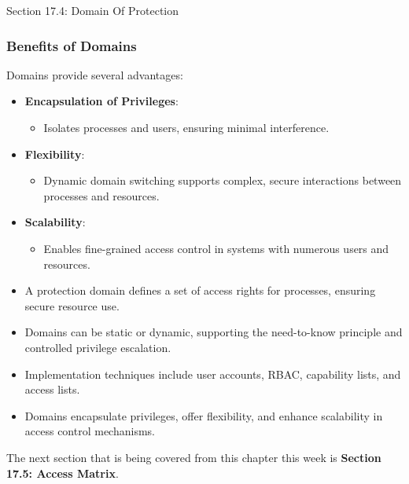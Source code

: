 \begin{notes}{Section 17.4: Domain Of Protection}
    \subsubsection*{Benefits of Domains}
    
    Domains provide several advantages:
    \begin{itemize}
        \item \textbf{Encapsulation of Privileges}:
        \begin{itemize}
            \item Isolates processes and users, ensuring minimal interference.
        \end{itemize}
        \item \textbf{Flexibility}:
        \begin{itemize}
            \item Dynamic domain switching supports complex, secure interactions between processes and resources.
        \end{itemize}
        \item \textbf{Scalability}:
        \begin{itemize}
            \item Enables fine-grained access control in systems with numerous users and resources.
        \end{itemize}
    \end{itemize}
    
    \begin{highlight}
        \begin{itemize}
            \item A protection domain defines a set of access rights for processes, ensuring secure resource use.
            \item Domains can be static or dynamic, supporting the need-to-know principle and controlled privilege escalation.
            \item Implementation techniques include user accounts, RBAC, capability lists, and access lists.
            \item Domains encapsulate privileges, offer flexibility, and enhance scalability in access control mechanisms.
        \end{itemize}
    \end{highlight}
\end{notes}

The next section that is being covered from this chapter this week is \textbf{Section 17.5: Access Matrix}.

